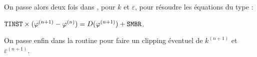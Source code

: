 On passe alors deux fois dans , pour $k$ et $\varepsilon$,
pour r\'esoudre les \'equations du type :

$\text{\texttt{TINST}}\times(\varphi^{(n+1)}-\varphi^{(n)}) = D(\varphi^{(n+1)})+\text{\texttt{SMBR}}$.

On passe enfin dans la routine  pour faire un clipping \'eventuel
de $k^{(n+1)}$ et $\varepsilon^{(n+1)}$.



